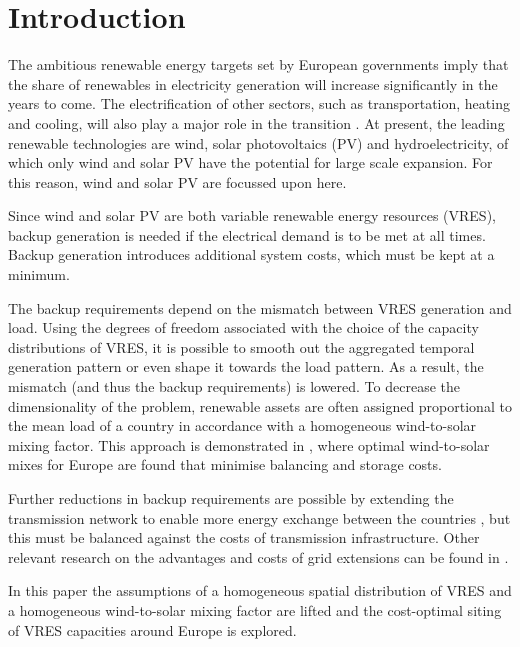\documentclass[a4paper, 5p, sort&compress]{elsarticle}%
\begin{document}
\section{Introduction}
\label{sec:one}

The ambitious renewable energy targets set by European governments
\cite{eu2050} imply that the share of renewables in electricity
generation will increase significantly in the years to come.  The
electrification of other sectors, such as transportation, heating and
cooling, will also play a major role in the transition
\cite{Williams12,ecf2050}. At present, the leading renewable
technologies are wind, solar photovoltaics (PV) and hydroelectricity,
of which only wind and solar PV have the potential for large scale
expansion. For this reason, wind and solar PV
are focussed upon here.

Since wind and solar PV are both variable renewable energy resources
(VRES), backup generation is needed if the electrical demand is to be met at all times. Backup generation introduces additional system costs, which
must be kept at a minimum.

The backup requirements depend on the mismatch between VRES generation
and load. Using the degrees of freedom associated with the choice of
the capacity distributions of VRES, it is possible to smooth out the
aggregated temporal generation pattern or even shape it towards the
load pattern. As a result, the mismatch (and thus the backup
requirements) is lowered.  To decrease the dimensionality of the
problem, renewable assets are often assigned proportional to the mean
load of a country in accordance with a homogeneous wind-to-solar mixing
factor. This approach is demonstrated in \cite{Heide2010,Heide2011},
where optimal wind-to-solar mixes for Europe are found that minimise balancing and storage costs.

Further reductions in backup requirements are possible by extending
the transmission network to enable more energy exchange between the
countries \cite{rolando2014,sarah}, but this must be balanced against the costs of transmission infrastructure. Other relevant research on the
advantages and costs of grid extensions can be found in
\cite{Papae,Schaber,Schaber2,Egerer,Brown}.


In this paper the assumptions of a homogeneous spatial distribution of
VRES and a homogeneous wind-to-solar mixing factor are lifted and the
cost-optimal siting of VRES capacities around Europe is explored.
\end{document}
